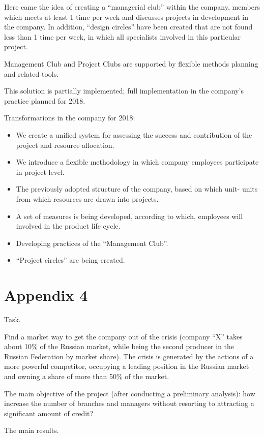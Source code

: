 \documentclass[11pt,a4paper]{book}
\begin{document}
Here came the idea of creating a “managerial club” within the company, members
which meets at least 1 time per week and discusses projects in development in
the company. In addition, “design circles” have been created that are not
found less than 1 time per week, in which all specialists involved in this
particular project.

Management Club and Project Clubs are supported by flexible methods planning
and related tools.

This solution is partially implemented; full implementation in the company's
practice planned for 2018.

Transformations in the company for 2018:
\begin{itemize}
\item We create a unified system for assessing the success and contribution of
  the project and resource allocation.
\item We introduce a flexible methodology in which company employees
  participate in project level.
\item The previously adopted structure of the company, based on which unit-
  units from which resources are drawn into projects.
\item A set of measures is being developed, according to which, employees will
  involved in the product life cycle.
\item Developing practices of the “Management Club”.
\item “Project circles” are being created.
\end{itemize}

\chapter{Appendix 4}

Task.

Find a market way to get the company out of the crisis (company “X” takes
about 10\% of the Russian market, while being the second producer in the
Russian Federation by market share).  The crisis is generated by the actions
of a more powerful competitor, occupying a leading position in the Russian
market and owning a share of more than 50\% of the market.

The main objective of the project (after conducting a preliminary analysis):
how increase the number of branches and managers without resorting to
attracting a significant amount of credit?

The main results.
\end{document}
